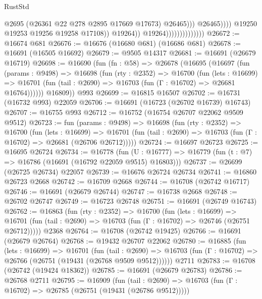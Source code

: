 \begin{lexlean}{RustStd}
\begin{coremodule}
                                                      @2695
                                                      (@26361 @22 @278 @2895 @17669 @17673)
                                                      @26465)))
                                                @26465))))
                                        @19250
                                        @19253
                                        @19256
                                        @19258
                                        @17108))
                                    @19264))
                                @19264))))))))))))))
@26672 := @16674 @681
@26676 := @16676 (@16680 @681) (@16686 @681)
@26678 := @16691 (@16505 @16692)
@26679 := @9505 @14317
@26681 := @16691 (@26679 @16719)
@26698 := @16690
    (fun (fn : @58) =>
    @26678
      (@16695
        (@16697
          (fun (params : @9498) =>
          @16698
            (fun (rty : @2352) =>
            @16700
              (fun (lets : @16699) =>
              @16701 (fun (tail : @2690) => @16703 (fun (Γ : @16702) => @26681 @16764))))))
        @16809))
    @993
@26699 := @16815 @16507
@26702 := @16731 (@16732 @993) @22059
@26706 := @16691 (@16723 (@26702 @16739) @16743)
@26707 := @16755 @993
@26712 := @16752 (@16754 @26707 @22062 @9509 @9512)
@26723 := fun (params : @9498) =>
  @16698
    (fun (rty : @2352) =>
    @16700
      (fun (lets : @16699) =>
      @16701 (fun (tail : @2690) => @16703 (fun (Γ : @16702) => @26681 (@26706 @26712)))))
@26724 := @16697 @26723
@26725 := @16695 @26724
@26734 := @16778
    (fun (U : @16777) => @16779 (fun (t : @7) => @16786 (@16691 (@16792 @22059 @9515) @16803)))
@26737 := @26699 (@26725 @26734) @22057
@26739 := @16676 @26724 @26734
@26741 := @16860 @26723 @2668
@26742 := @16709 @2668
@26744 := @16708 (@26742 @16717)
@26746 := @16691 (@26679 @26744)
@26747 := @16738 @2668
@26748 := @26702 @26747
@26749 := @16723 @26748
@26751 := @16691 (@26749 @16743)
@26762 := @16863
    (fun (rty : @2352) =>
    @16700
      (fun (lets : @16699) =>
      @16701 (fun (tail : @2690) => @16703 (fun (Γ : @16702) => @26746 (@26751 @26712)))))
    @2368
@26764 := @16708 (@26742 @19425)
@26766 := @16691 (@26679 @26764)
@26768 := @19432 @26707 @22062
@26780 := @16885
    (fun (lets : @16699) =>
    @16701
      (fun (tail : @2690) =>
      @16703 (fun (Γ : @16702) => @26766 (@26751 (@19431 (@26768 @9509 @9512))))))
    @2711
@26783 := @16708 (@26742 (@19424 @18362))
@26785 := @16691 (@26679 @26783)
@26786 := @26768 @2711
@26795 := @16909
    (fun (tail : @2690) => @16703 (fun (Γ : @16702) => @26785 (@26751 (@19431 (@26786 @9512)))))

\end{coremodule}
\end{lexlean}
